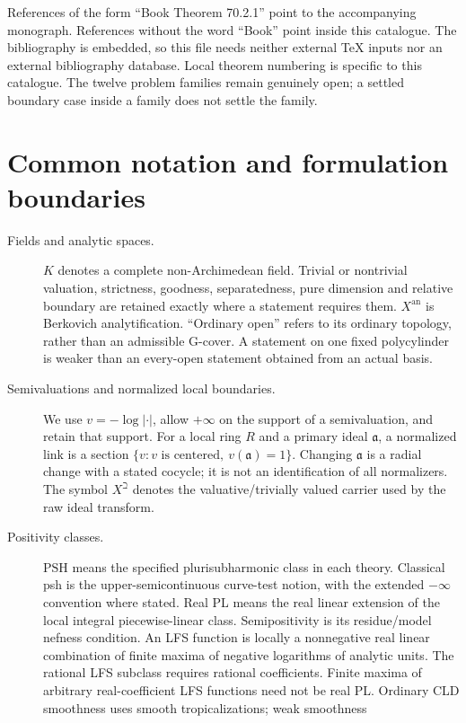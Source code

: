 \documentclass[11pt,a4paper]{article}
\theoremstyle{definition}
\theoremstyle{remark}
\newcommand{\PSH}{\mathrm{PSH}}
\begin{document}
References of the form ``Book Theorem 70.2.1'' point to the accompanying
monograph. References without the word ``Book'' point inside this catalogue.
The bibliography is embedded, so this file needs neither external TeX
inputs nor an external bibliography database. Local theorem numbering is
specific to this catalogue. The twelve problem families remain genuinely
open; a settled boundary case inside a family does not settle the family.

\section*{Common notation and formulation boundaries}
\begin{description}
\item[Fields and analytic spaces.]
\(K\) denotes a complete non-Archimedean field. Trivial or nontrivial valuation,
strictness, goodness, separatedness, pure dimension and relative boundary
are retained exactly where a statement requires them. \(X^{\mathrm{an}}\)
is Berkovich analytification. ``Ordinary open'' refers to its ordinary
topology, rather than an admissible G-cover. A statement on one fixed
polycylinder is weaker than an every-open statement obtained from an actual
basis.
\item[Semivaluations and normalized local boundaries.]
We use \(v=-\log|\cdot|\), allow \(+\infty\) on the support of a
semivaluation, and retain that support. For a local ring \(R\) and a primary
ideal \(\mathfrak a\), a normalized link is a section
\(\{v:v\text{ is centered},\ v(\mathfrak a)=1\}\).
Changing \(\mathfrak a\) is a radial change with a stated cocycle; it is not
an identification of all normalizers. The symbol \(X^\beth\) denotes the
valuative/trivially valued carrier used by the raw ideal transform.
\item[Positivity classes.]
\(\PSH\) means the specified plurisubharmonic class in each theory.
Classical psh is the upper-semicontinuous curve-test notion, with the
extended \(-\infty\) convention where stated. Real PL means the real linear
extension of the local integral piecewise-linear class. Semipositivity is
its residue/model nefness condition. An LFS function is locally a
nonnegative real linear combination of finite maxima of negative logarithms
of analytic units. The rational LFS subclass requires rational
coefficients. Finite maxima of arbitrary real-coefficient LFS functions
need not be real PL.
Ordinary CLD smoothness uses smooth tropicalizations; weak smoothness

\end{description}
\end{document}

